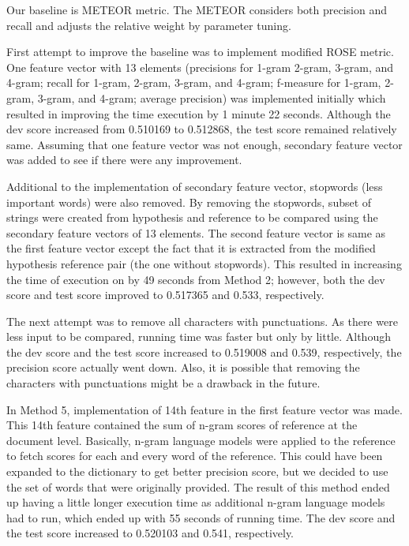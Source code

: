 \documentclass[11pt,letterpaper]{article}
\begin{document}
Our baseline is METEOR metric. The METEOR considers both precision and recall and adjusts the relative weight by parameter tuning. \par
First attempt to improve the baseline was to implement modified ROSE metric. One feature vector with 13 elements (precisions for 1-gram 2-gram, 3-gram, and 4-gram; recall for 1-gram, 2-gram, 3-gram, and 4-gram; f-measure for 1-gram, 2-gram, 3-gram, and 4-gram; average precision) was implemented initially which resulted in improving the time execution by 1 minute 22 seconds. Although the dev score increased from 0.510169 to 0.512868, the test score remained relatively same. Assuming that one feature vector was not enough, secondary feature vector was added to see if there were any improvement. \par
        Additional to the implementation of secondary feature vector, stopwords (less important words) were also removed. By removing the stopwords, subset of strings were created from hypothesis and reference to be compared using the secondary feature vectors of 13 elements. The second feature vector is same as the first feature vector except the fact that it is extracted from the modified hypothesis reference pair (the one without stopwords).  This resulted in increasing the time of execution on by 49 seconds from Method 2; however, both the dev score and test score improved to 0.517365 and 0.533, respectively.\par
        The next attempt was to remove all characters with punctuations. As there were less input to be compared, running time was faster but only by little. Although the dev score and the test score increased to 0.519008 and 0.539, respectively, the precision score actually went down. Also, it is possible that removing the characters with punctuations might be a drawback in the future.\par
        In Method 5, implementation of 14th feature in the first feature vector was made. This 14th feature contained the sum of n-gram scores of reference at the document level. Basically, n-gram language models were applied to the reference to fetch scores for each and every word of the reference. This could have been expanded to the dictionary to get better precision score, but we decided to use the set of words that were originally provided. The result of this method ended up having a little longer execution time as additional n-gram language models had to run, which ended up with 55 seconds of running time. The dev score and the test score increased to 0.520103 and 0.541, respectively.\par
\end{document}
